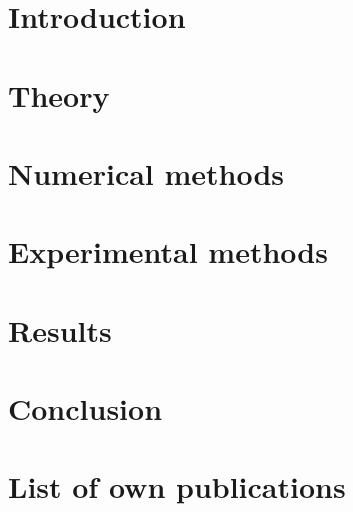 \documentclass[a4paper,12pt]{report}
\begin{document}

\tableofcontents

\chapter{Introduction}


\chapter{Theory} %


\chapter{Numerical methods} 


\chapter{Experimental methods}


\chapter{Results}


\chapter{Conclusion} %
%

\label{endtext} 

\printbibliography

\chapter*{List of own publications}

\label{enddocument} 
\end{document}
